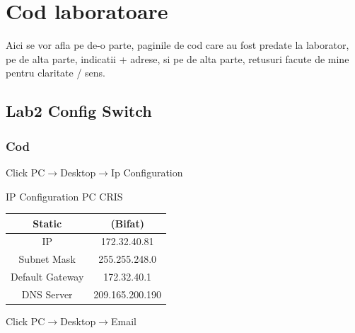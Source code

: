 \documentclass{article}
\begin{document}
\section{Cod laboratoare}
Aici se vor afla pe de-o parte, paginile de cod care au fost predate la laborator, pe de alta parte, indicatii + adrese, si pe de alta parte, retusuri facute de mine pentru claritate / sens.

\subsection{Lab2 Config Switch}
\subsubsection{Cod}

Click PC$\rightarrow$Desktop$\rightarrow$Ip Configuration

\begin{center}
    IP Configuration PC CRIS
\end{center}
\begin{center}
    \begin{tabular}{|c|c|}\hline
         Static & (Bifat)  \\ \hline \hline
         IP & 172.32.40.81  \\ \hline
         Subnet Mask & 255.255.248.0 \\ \hline
         Default Gateway & 172.32.40.1 \\ \hline
         DNS Server & 209.165.200.190 \\ \hline
    \end{tabular}
\end{center}

Click PC$\rightarrow$Desktop$\rightarrow$Email
\end{document}
